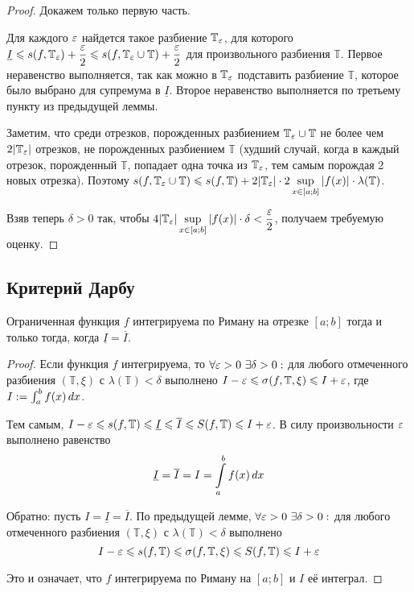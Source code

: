 \documentclass[a4paper]{article}
\theoremstyle{named}
\newcommand{\T}{\mathbb{T}}
\renewcommand{\int}{\intop}
\begin{document}
        \begin{proof}
            Докажем только первую часть. 

            Для каждого $\varepsilon$ найдется такое разбиение $\T_{\eps}$, для которого $\underline{I} \leq s(f, \T_{\eps}) + \dfrac{\eps}{2} \leq s(f, \T_{\eps} \cup \T) + \dfrac{\eps}{2}$ для произвольного разбиения $\T$. Первое неравенство выполняется, так как можно в $\T_{\eps}$ подставить разбиение $\T$, которое было выбрано для супремума в $\underline{I}$. Второе неравенство выполняется по третьему пункту из предыдущей леммы.

            Заметим, что среди отрезков, порожденных разбиением $\T_{\eps} \cup \T$ не более чем $2|\T_{\eps}|$ отрезков, не порожденных разбиением $\T$ (худший случай, когда в каждый отрезок, порожденный $\T$, попадает одна точка из $\T_{\eps}$, тем самым порождая 2 новых отрезка). Поэтому $s(f, \T_{\eps} \cup \T) \leq s(f, \T) + 2|\T_{\eps}| \cdot 2 \sup\limits_{x \in [a; b]} |f(x)| \cdot \lambda(\T)$.

            Взяв теперь $\delta > 0$ так, чтобы $4|\T_{\eps}| \sup\limits_{x \in [a; b]} |f(x)| \cdot \delta < \dfrac{\eps}{2}$, получаем требуемую оценку.
        \end{proof}

        \subsection{Критерий Дарбу}

        \begin{theorem*}
            Ограниченная функция $f$ интегрируема по Риману на отрезке $[a; b]$ тогда и только тогда, когда $\underline{I} = \overline{I}$.
        \end{theorem*}

        \begin{proof}
            Если функция $f$ интегрируема, то $\forall \eps > 0 \ \exists \delta > 0:$ для любого отмеченного разбиения $(\T, \xi)$ с $\lambda(\T) < \delta$ выполнено $I - \eps \leq \sigma(f, \T, \xi) \leq I + \eps$, где $I := \int_a^b f(x) \dd x$.

            Тем самым, $I - \eps \leq s(f, \T) \leq \underline{I} \leq \overline{I} \leq S(f, \T) \leq I + \eps$. В силу произвольности $\varepsilon$ выполнено равенство
            \begin{equation*}
                \underline{I} = \overline{I} = I = \int_a^b f(x) \dd x
            \end{equation*}

            Обратно: пусть $I = \underline{I} = \overline{I}$. По предыдущей лемме, $\forall \eps > 0 \ \exists \delta > 0:$ для любого отмеченного разбиения $(\T, \xi)$ с $\lambda(\T) < \delta$ выполнено
            \begin{equation*}
                I - \eps \leq s(f, \T) \leq \sigma(f, \T, \xi) \leq S(f, \T) \leq I + \eps
            \end{equation*}

            Это и означает, что $f$ интегрируема по Риману на $[a; b]$ и $I$ её интеграл.
        \end{proof}
\end{document}
